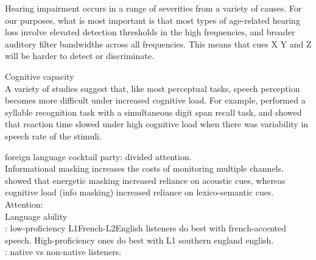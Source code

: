 Hearing impairment occurs in a range of severities from a variety of causes.  For our purposes, what is most important is that most types of age-related hearing loss involve elevated detection thresholds in the high frequencies, and broader auditory filter bandwidths across all frequencies.  This means that cues X Y and Z will be harder to detect or discriminate.

Cognitive capacity\\
A variety of studies suggest that, like most perceptual tasks, speech perception becomes more difficult under increased cognitive load.  For example, \citet{FrancisNusbaum1996} performed a syllable recognition task with a simultaneous digit span recall task, and showed that reaction time slowed under high cognitive load when there was variability in speech rate of the stimuli.  

\citet{CookeEtAl2008} foreign language cocktail party: divided attention.\\
\citet{KiddEtAl2008} Informational masking increases the costs of monitoring multiple channels.\\
\citet{MattysEtAl2009} showed that energetic masking increased reliance on acoustic cues, whereas cognitive load (info masking) increased reliance on lexico-semantic cues.\\  
Attention:  \citep{KitterickEtAl2010, KiddEtAl2005a, BestEtAl2006, GallunEtAl2007}\\

Language ability\\
\citep{PinetEtAl2011}: low-proficiency L1French-L2English listeners do best with french-accented speech.  High-proficiency ones do best with L1 southern england english.  \\
\citep{CookeEtAl2008, CookeEtAl2010, BrouwerEtAl2012}: native vs non-native listeners.

